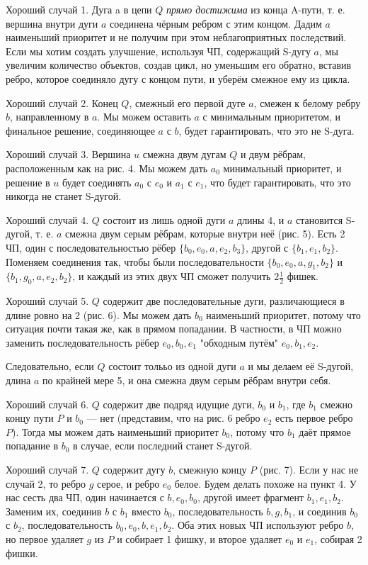 Хороший случай 1.
Дуга a в цепи $Q$ \textit{прямо достижима} из конца A-пути, т. е. вершина внутри дуги $a$ соединена чёрным ребром с этим концом. Дадим $a$ наименьший приоритет и не получим при этом неблагоприятных последствий. Если мы хотим создать улучшение, используя ЧП, содержащий S-дугу $a$, мы увеличим количество объектов, создав цикл, но уменьшим его обратно, вставив ребро, которое соединяло дугу с концом пути, и уберём смежное ему из цикла.

Хороший случай 2.
Конец $Q$, смежный его первой дуге $a$, смежен к белому ребру $b$, направленному в $a$. Мы можем оставить $a$ с минимальным приоритетом, и финальное решение, соединяющее $a$ с $b$, будет гарантировать, что это не S-дуга.

Хороший случай 3. 
Вершина $u$ смежна двум дугам $Q$ и двум рёбрам, расположенным как на рис. 4. Мы можем дать $a_0$ минимальный приоритет, и решение в $u$ будет соединять $a_0$ с $e_0$ и $a_1$ с $e_1$, что будет гарантировать, что это никогда не станет S-дугой.

Хороший случай 4.
$Q$ состоит из лишь одной дуги $a$ длины 4, и $a$ становится S-дугой, т. е. $a$ смежна двум серым рёбрам, которые внутри неё (рис. 5). Есть 2 ЧП, один с последовательностью рёбер $\{b_0, e_0, a, e_2, b_3\}$, другой с $\{b_1, e_1, b_2\}$. Поменяем соединения так, чтобы были последовательности $\{b_0, e_0, a, g_1, b_2\}$ и $\{b_1, g_0, a, e_2, b_2\}$, и каждый из этих двух ЧП сможет получить $2\frac{1}{2}$ фишек.

Хороший случай 5. $Q$ содержит две последовательные дуги, различающиеся в длине ровно на 2 (рис. 6). Мы можем дать $b_0$ наименьший приоритет, потому что ситуация почти такая же, как в прямом попадании. В частности, в ЧП можно заменить последовательность рёбер $e_0, b_0, e_1$ "обходным путём" $e_0, b_1, e_2$. 

Следовательно, если $Q$ состоит толььо из одной дуги $a$ и мы делаем её S-дугой, длина $a$ по крайней мере 5, и она смежна двум серым рёбрам внутри себя.

Хороший случай 6.
$Q$ содержит две подряд идущие дуги, $b_0$ и $b_1$, где $b_1$ смежно концу пути $P$ и $b_0$ --- нет (представим, что на рис. 6 ребро $e_2$ есть первое ребро $P$). Тогда мы можем дать наименьший приоритет $b_0$, потому что $b_1$ даёт прямое попадание в $b_0$ в случае, если последний станет S-дугой.

Хороший случай 7.
$Q$ содержит дугу $b$, смежную концу $P$ (рис. 7). Если у нас не случай 2, то ребро $g$ серое, и ребро $e_0$ белое. Будем делать похоже на пункт 4. У нас сесть два ЧП, один начинается с $b, e_0, b_0$, другой имеет фрагмент $b_1, e_1, b_2$. Заменим их, соединив $b$ с $b_1$ вместо $b_0$, последовательность $b, g, b_1$, и соединив $b_0$ с $b_2$, последовательность $b_0, e_0, b, e_1, b_2$. Оба этих новых ЧП используют ребро $b$, но первое удаляет $g$ из $P$ и собирает 1 фишку, и второе удаляет $e_0$ и $e_1$, собирая 2 фишки. 

